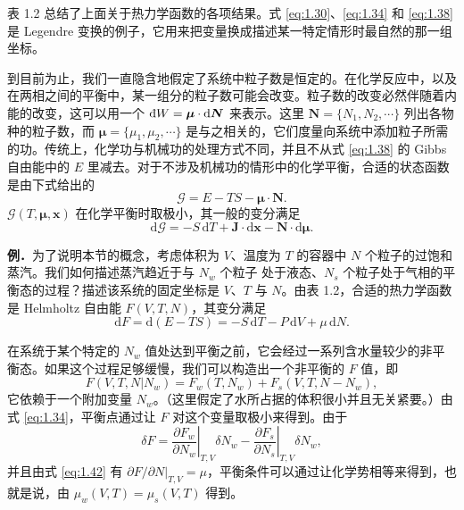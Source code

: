 表 1.2 总结了上面关于热力学函数的各项结果。式 \eqref{eq:1.30}、\eqref{eq:1.34} 和 \eqref{eq:1.38} 是 Legendre 变换的例子，它用来把变量换成描述某一特定情形时最自然的那一组坐标。

到目前为止，我们一直隐含地假定了系统中粒子数是恒定的。在化学反应中，以及在两相之间的平衡中，某一组分的粒子数可能会改变。粒子数的改变必然伴随着内能的改变，这可以用一个 $\inexd W=\bm{\mu}\cdot\mathrm{d}\bm{N}$ 来表示。这里 $\bm{N}=\{N_1,N_2,\cdots\}$ 列出各物种的粒子数，而 $\bm{\mu}=\{\mu_1,\mu_2,\cdots\}$ 是与之相关的，它们度量向系统中添加粒子所需的功。传统上，化学功与机械功的处理方式不同，并且不从式 \eqref{eq:1.38} 的 Gibbs 自由能中的 $E$ 里减去。对于不涉及机械功的情形中的化学平衡，合适的状态函数是由下式给出的
\begin{equation}
\mathcal{G}=E-TS-\bm{\mu}\cdot\bm{N}.
\label{eq:1.40}
\end{equation}
$\mathcal{G}(T,\bm{\mu},\bm{x})$ 在化学平衡时取极小，其一般的变分满足
\begin{equation}
\mathrm{d}\mathcal{G}=-S\,\mathrm{d}T+\bm{J}\cdot\mathrm{d}\bm{x}-\bm{N}\cdot\mathrm{d}\bm{\mu}.
\label{eq:1.41}
\end{equation}

\textbf{例．}\quad 为了说明本节的概念，考虑体积为 $V$、温度为 $T$ 的容器中 $N$ 个粒子的过饱和蒸汽。我们如何描述蒸汽趋近于与 $N_w$ 个粒子
处于液态、$N_s$ 个粒子处于气相的平衡态的过程？描述该系统的固定坐标是 $V$、$T$ 与 $N$。由表 1.2，合适的热力学函数是 Helmholtz 自由能 $F(V,T,N)$，其变分满足
\begin{equation}
\mathrm{d}F=\mathrm{d}(E-TS)=-S\,\mathrm{d}T-P\,\mathrm{d}V+\mu\,\mathrm{d}N.
\label{eq:1.42}
\end{equation}


在系统于某个特定的 $N_w$ 值处达到平衡之前，它会经过一系列含水量较少的非平衡态。如果这个过程足够缓慢，我们可以构造出一个非平衡的 $F$ 值，即
\begin{equation}
F(V,T,N|N_w)=F_w(T,N_w)+F_s(V,T,N-N_w),
\label{eq:1.43}
\end{equation}
它依赖于一个附加变量 $N_w$。（这里假定了水所占据的体积很小并且无关紧要。）由式 \eqref{eq:1.34}，平衡点通过让 $F$ 对这个变量取极小来得到。由于
\begin{equation}
\delta F=\left.\frac{\partial F_w}{\partial N_w}\right|_{T,V}\delta N_w-\left.\frac{\partial F_s}{\partial N_s}\right|_{T,V}\delta N_w,
\label{eq:1.44}
\end{equation}
并且由式 \eqref{eq:1.42} 有 $\left.\partial F/\partial N\right|_{T,V}=\mu$，平衡条件可以通过让化学势相等来得到，也就是说，由 $\mu_w(V,T)=\mu_s(V,T)$ 得到。

